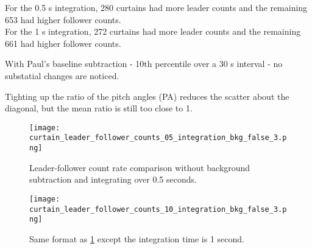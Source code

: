 \documentclass[
10pt, %
a4paper, %
oneside, %
headinclude,footinclude, %
BCOR5mm, %
]{scrartcl}
\begin{document}
For the 0.5 s integration, 280 curtains had more leader counts and the remaining 653 had higher follower counts. \\

\noindent For the 1 s integration, 272 curtains had more leader counts and the remaining 661 had higher follower counts.

With Paul's baseline subtraction - 10th percentile over a 30 s interval - no substatial changes are noticed.

Tighting up the ratio of the pitch angles (PA) reduces the scatter about the diagonal, but the mean ratio is still too close to 1.

\iffalse
\begin{figure}[htb]
\centering
\subfloat[AC6A ahead by 22 s]{\texttt{[image: curtain\_leader\_follower\_counts\_05\_integration\_bkg\_false.png]}} \quad
\subfloat[AC6A ahead by 8 s]{\texttt{[image: curtain\_leader\_follower\_counts\_10\_integration\_bkg\_false.png]}\label{fig:ipsum}}
\caption{Leader-follower count rate comparison without background subtraction and integrating over 0.5 seconds on the left panel, and 1 second on the right panel.}
\label{curtain_examples}
\end{figure}
\fi

\begin{figure}[ht]
\centering
\texttt{[image: curtain\_leader\_follower\_counts\_05\_integration\_bkg\_false\_3.png]}
\caption{Leader-follower count rate comparison without background subtraction and integrating over 0.5 seconds.}
\label{curtain_leader_follower_05}
\end{figure}

\begin{figure}[ht]
\centering
\texttt{[image: curtain\_leader\_follower\_counts\_10\_integration\_bkg\_false\_3.png]}
\caption{Same format as \ref{curtain_leader_follower_05} except the integration time is 1 second.}
\label{curtain_leader_follower_10}
\end{figure}
\end{document}
